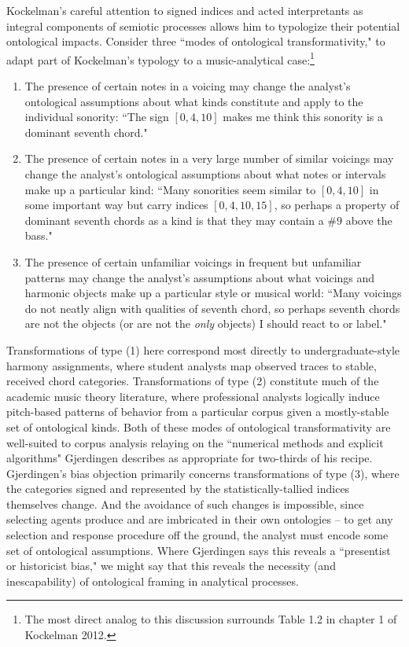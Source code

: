 Kockelman's careful attention to signed indices and acted interpretants as integral components of semiotic processes allows him to typologize their potential ontological impacts.  Consider three ``modes of ontological transformativity," to adapt part of Kockelman's typology to a music-analytical case:\footnote{The most direct analog to this discussion surrounds Table 1.2 in chapter 1 of Kockelman 2012.}
\begin{enumerate}
	\item The presence of certain notes in a voicing may change the analyst's ontological assumptions about what kinds constitute and apply to the individual sonority: ``The sign $[0,4,10]$ makes me think this sonority is a dominant seventh chord."
	\item The presence of certain notes in a very large number of similar voicings may change the analyst's ontological assumptions about what notes or intervals make up a particular kind: ``Many sonorities seem similar to $[0,4,10]$ in some important way but carry indices $[0,4,10,15]$, so perhaps a property of dominant seventh chords as a kind is that they may contain a $\# 9$ above the bass."
	\item The presence of certain unfamiliar voicings in frequent but unfamiliar patterns may change the analyst's assumptions about what voicings and harmonic objects make up a particular style or musical world: ``Many voicings do not neatly align with qualities of seventh chord, so perhaps seventh chords are not the objects (or are not the \emph{only} objects) I should react to or label."
\end{enumerate}
Transformations of type (1) here correspond most directly to undergraduate-style harmony assignments, where student analysts map observed traces to stable, received chord categories.  Transformations of type (2) constitute much of the academic music theory literature, where professional analysts logically induce pitch-based patterns of behavior from a particular corpus given a mostly-stable set of ontological kinds.  Both of these modes of ontological transformativity are well-suited to corpus analysis relaying on the ``numerical methods and explicit algorithms" Gjerdingen describes as appropriate for two-thirds of his recipe.  Gjerdingen's bias objection primarily concerns transformations of type (3), where the categories signed and represented by the statistically-tallied indices themselves change.  And the avoidance of such changes is impossible, since selecting agents produce and are imbricated in their own ontologies -- to get any selection and response procedure off the ground, the analyst must encode some set of ontological assumptions.  Where Gjerdingen says this reveals a ``presentist or historicist bias," we might say that this reveals the necessity (and inescapability) of ontological framing in analytical processes.

